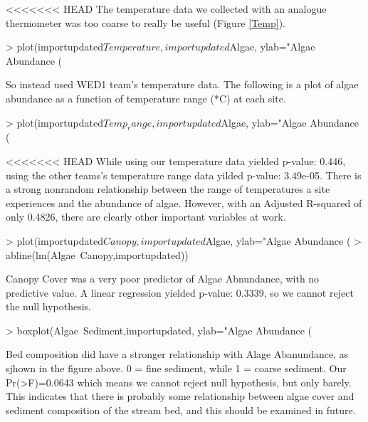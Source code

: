 \documentclass{article}\usepackage[]{graphicx}\usepackage[]{color}
\begin{document}
<<<<<<< HEAD
The temperature data we collected with an analogue thermometer was too coarse to really be useful (Figure \ref{Temp}).
\begin{Schunk}
\begin{Sinput}
> plot(importupdated$Temperature,importupdated$Algae, ylab="Algae Abundance (%
\end{Sinput}
\end{Schunk}
So instead used WED1 team's temperature data. The following is a plot of algae abundance as a function of temperature range (*C) at each site. 
\begin{Schunk}
\begin{Sinput}
> plot(importupdated$Temp_range,importupdated$Algae, ylab="Algae Abundance (%
\end{Sinput}
\end{Schunk}
<<<<<<< HEAD
While using our temperature data yielded p-value: 0.446, using the other teams's temperature range data yilded p-value: 3.49e-05. There is a strong nonrandom relationship between the range of temperatures a site experiences and the abundance of algae. However, with an Adjusted R-squared of only 0.4826, there are clearly other important variables at work. 
\begin{Schunk}
\begin{Sinput}
> plot(importupdated$Canopy,importupdated$Algae, ylab="Algae Abundance (%
> abline(lm(Algae~Canopy,importupdated))
\end{Sinput}
\end{Schunk}
Canopy Cover was a very poor predictor of Algae Abnundance, with no predictive value. A linear regression yielded p-value: 0.3339, so we cannot reject the null hypothesis.
\begin{Schunk}
\begin{Sinput}
> boxplot(Algae~Sediment,importupdated, ylab="Algae Abundance (%
\end{Sinput}
\end{Schunk}
Bed composition did have a stronger relationship with Alage Abanundance, as sjhown in the figure above. 0 = fine sediment, while 1 = coarse sediment. Our Pr(>F)=0.0643 which means we cannot reject null hypothesis, but only barely. This indicates that there is probably some relationship between algae cover and sediment composition of the stream bed, and this should be examined in future.
\end{document}
